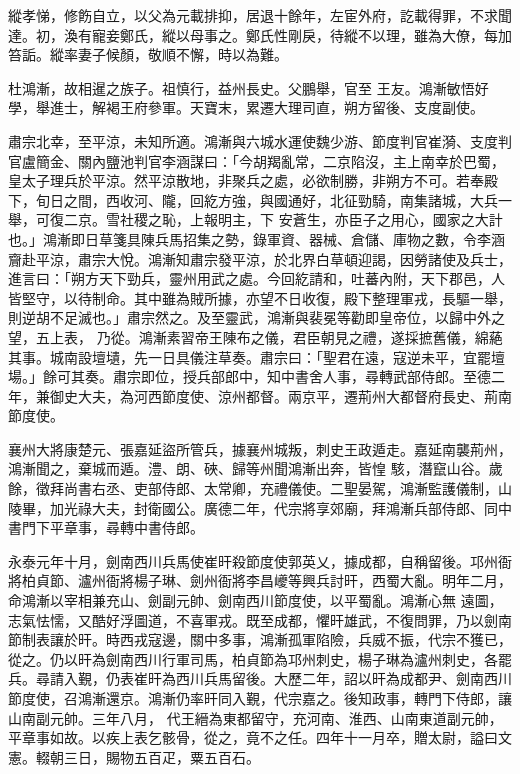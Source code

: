 \begin{pinyinscope}
 縱孝悌，修飭自立，以父為元載排抑，居退十餘年，左宦外府，訖載得罪，不求聞達。初，渙有寵妾鄭氏，縱以母事之。鄭氏性剛戾，待縱不以理，雖為大僚，每加笞詬。縱率妻子候顏，敬順不懈，時以為難。



 杜鴻漸，故相暹之族子。祖慎行，益州長史。父鵬舉，官至
 王友。鴻漸敏悟好學，舉進士，解褐王府參軍。天寶末，累遷大理司直，朔方留後、支度副使。



 肅宗北幸，至平涼，未知所適。鴻漸與六城水運使魏少游、節度判官崔漪、支度判官盧簡金、關內鹽池判官李涵謀曰：「今胡羯亂常，二京陷沒，主上南幸於巴蜀，皇太子理兵於平涼。然平涼散地，非聚兵之處，必欲制勝，非朔方不可。若奉殿下，旬日之間，西收河、隴，回紇方強，與國通好，北征勁騎，南集諸城，大兵一舉，可復二京。雪社稷之恥，上報明主，下
 安蒼生，亦臣子之用心，國家之大計也。」鴻漸即日草箋具陳兵馬招集之勢，錄軍資、器械、倉儲、庫物之數，令李涵齎赴平涼，肅宗大悅。鴻漸知肅宗發平涼，於北界白草頓迎謁，因勞諸使及兵士，進言曰：「朔方天下勁兵，靈州用武之處。今回紇請和，吐蕃內附，天下郡邑，人皆堅守，以待制命。其中雖為賊所據，亦望不日收復，殿下整理軍戎，長驅一舉，則逆胡不足滅也。」肅宗然之。及至靈武，鴻漸與裴冕等勸即皇帝位，以歸中外之望，五上表，
 乃從。鴻漸素習帝王陳布之儀，君臣朝見之禮，遂採摭舊儀，綿蕝其事。城南設壇壝，先一日具儀注草奏。肅宗曰：「聖君在遠，寇逆未平，宜罷壇場。」餘可其奏。肅宗即位，授兵部郎中，知中書舍人事，尋轉武部侍郎。至德二年，兼御史大夫，為河西節度使、涼州都督。兩京平，遷荊州大都督府長史、荊南節度使。



 襄州大將康楚元、張嘉延盜所管兵，據襄州城叛，刺史王政遁走。嘉延南襲荊州，鴻漸聞之，棄城而遁。澧、朗、硤、歸等州聞鴻漸出奔，皆惶
 駭，潛竄山谷。歲餘，徵拜尚書右丞、吏部侍郎、太常卿，充禮儀使。二聖晏駕，鴻漸監護儀制，山陵畢，加光祿大夫，封衛國公。廣德二年，代宗將享郊廟，拜鴻漸兵部侍郎、同中書門下平章事，尋轉中書侍郎。



 永泰元年十月，劍南西川兵馬使崔旰殺節度使郭英乂，據成都，自稱留後。邛州衙將柏貞節、瀘州衙將楊子琳、劍州衙將李昌巙等興兵討旰，西蜀大亂。明年二月，命鴻漸以宰相兼充山、劍副元帥、劍南西川節度使，以平蜀亂。鴻漸心無
 遠圖，志氣怯懦，又酷好浮圖道，不喜軍戎。既至成都，懼旰雄武，不復問罪，乃以劍南節制表讓於旰。時西戎寇邊，關中多事，鴻漸孤軍陷險，兵威不振，代宗不獲已，從之。仍以旰為劍南西川行軍司馬，柏貞節為邛州刺史，楊子琳為瀘州刺史，各罷兵。尋請入覲，仍表崔旰為西川兵馬留後。大歷二年，詔以旰為成都尹、劍南西川節度使，召鴻漸還京。鴻漸仍率旰同入覲，代宗嘉之。後知政事，轉門下侍郎，讓山南副元帥。三年八月，
 代王縉為東都留守，充河南、淮西、山南東道副元帥，平章事如故。以疾上表乞骸骨，從之，竟不之任。四年十一月卒，贈太尉，謚曰文憲。輟朝三日，賜物五百疋，粟五百石。




\end{pinyinscope}
